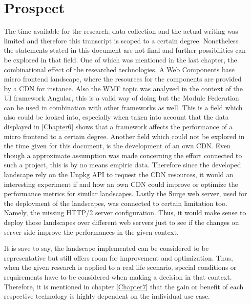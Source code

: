 \chapter{Prospect} %
\label{Chapter8}


The time available for the research, data collection and the actual writing was limited and therefore this transcript is scoped to a certain degree. Nonetheless the statements stated in this document are not final and further possibilities can be explored in that field. One of which was mentioned in the last chapter, the combinational effect of the researched technologies. A Web Components base micro frontend landscape, where the resources for the components are provided by a CDN for instance. Also the WMF topic was analyzed in the context of the UI framework Angular, this is a valid way of doing but the Module Federation can be used in combination with other frameworks as well. This is a field which also could be looked into, especially when taken into account that the data displayed in \ref{Chapter6} shows that a framework affects the performance of a micro frontend to a certain degree.
Another field which could not be explored in the time given for this document, is the development of an own CDN. Even though a approximate assumption was made concerning the effort connected to such a project, this is by no means empiric data. Therefore since the developed landscape rely on the Unpkg API to request the CDN  resources, it would an interesting experiment if and how an own CDN could improve or optimize the performance metrics for similar landscapes.
Lastly the Surge web server, used for the deployment of the landscapes, was connected to certain limitation too. Namely, the missing HTTP/2 server configuration. Thus, it would make sense to deploy those landscapes over different web servers just to see if the changes on server side improve the performances in the given context.

It is save to say, the landscape implemented can be considered to be representative but still offers room for improvement and optimization. Thus, when the given research is applied to a real life scenario, special conditions or requirements have to be considered when making a decision in that context. Therefore, it is mentioned in chapter \ref{Chapter7} that the gain or benefit of each respective technology is highly dependent on the individual use case.




